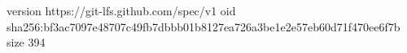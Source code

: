 version https://git-lfs.github.com/spec/v1
oid sha256:bf3ac7097e48707c49fb7dbbb01b8127ea726a3be1e2e57eb60d71f470ee6f7b
size 394
